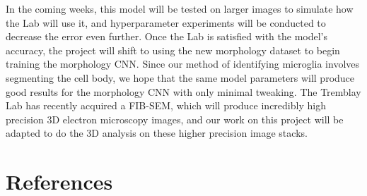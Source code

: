 \documentclass{article}
\begin{document}
In the coming weeks, this model will be tested on larger images to simulate 
how the Lab will use it, and hyperparameter experiments will be conducted to 
decrease the error even further. Once the Lab is satisfied with the model's 
accuracy, the project will shift to using the new morphology dataset to begin 
training the morphology CNN. Since our method of identifying microglia 
involves segmenting the cell body, we hope that the same model parameters 
will produce good results for the morphology CNN with only minimal tweaking. 
The Tremblay Lab has recently acquired a FIB-SEM, which will produce 
incredibly high precision 3D electron microscopy images, and our work on this 
project will be adapted to do the 3D analysis on these higher precision image 
stacks.

\FloatBarrier

\newpage
\section{References}

\printbibliography[heading=none]
\end{document}
